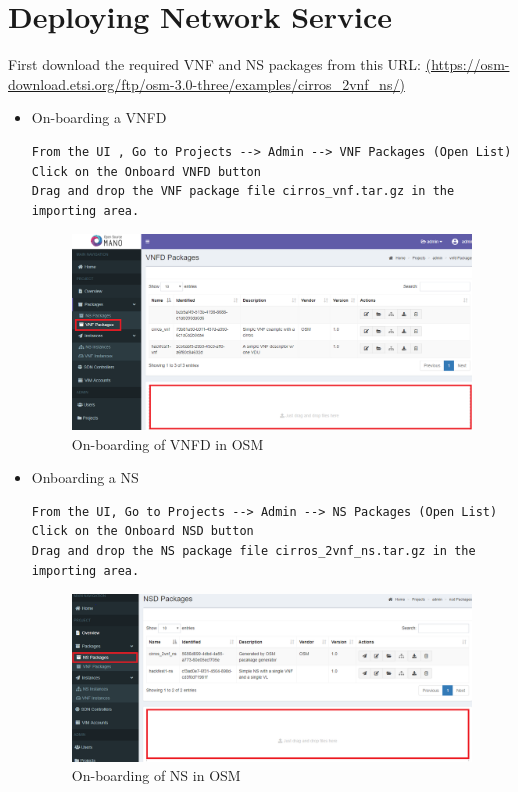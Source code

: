 \section{Deploying Network Service}
First download the required VNF and NS packages from this URL: \hyperlink{name}{(https://osm-download.etsi.org/ftp/osm-3.0-three/examples/cirros\_2vnf\_ns/)}
\begin{itemize}
\item On-boarding a VNFD
\begin{lstlisting}
From the UI , Go to Projects --> Admin --> VNF Packages (Open List)
Click on the Onboard VNFD button
Drag and drop the VNF package file cirros_vnf.tar.gz in the importing area.
\end{lstlisting}
\begin{figure} [H]
	\centering
	\includegraphics[width=0.5\linewidth]{figures/sh4}
	\caption{On-boarding of VNFD in OSM}
\end{figure}

\item Onboarding a NS
\begin{lstlisting}
From the UI, Go to Projects --> Admin --> NS Packages (Open List)
Click on the Onboard NSD button
Drag and drop the NS package file cirros_2vnf_ns.tar.gz in the importing area.
\end{lstlisting}
\begin{figure} [H]
	\centering
	\includegraphics[width=0.5\linewidth]{figures/sh3}
	\caption{On-boarding of NS in OSM}
\end{figure}



\end{itemize}
